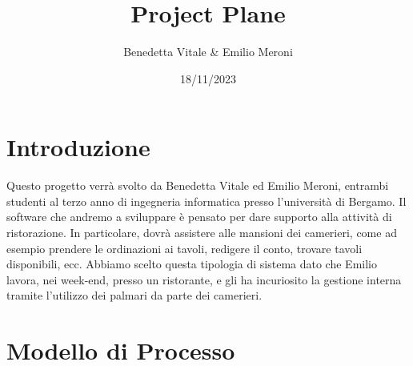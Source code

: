 
\title{Project Plane}
\author{Benedetta Vitale & Emilio Meroni}
\date{18/11/2023}



\chapter{Introduzione}

Questo progetto verrà svolto da Benedetta Vitale ed Emilio Meroni, entrambi studenti al terzo anno di ingegneria informatica presso l'università di Bergamo.
Il software che andremo a sviluppare è pensato per dare supporto alla attività di ristorazione. In particolare, dovrà assistere alle mansioni dei camerieri, come ad esempio prendere le ordinazioni ai tavoli, redigere il conto, trovare tavoli disponibili, ecc.
Abbiamo scelto questa tipologia di sistema dato che Emilio lavora, nei week-end, presso un ristorante, e gli ha incuriosito la gestione interna tramite l'utilizzo dei palmari da parte dei camerieri. 


\chapter{Modello di Processo}


